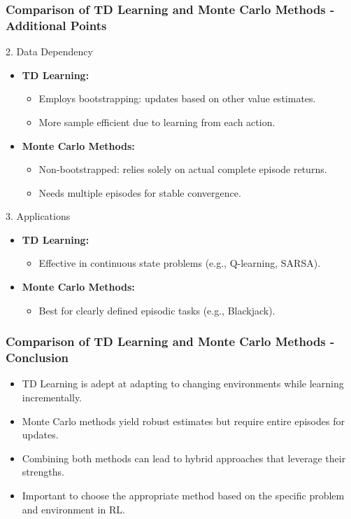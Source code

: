 \documentclass[aspectratio=169]{beamer}
\begin{document}
\begin{frame}[fragile]
    \frametitle{Comparison of TD Learning and Monte Carlo Methods - Additional Points}
    \begin{block}{2. Data Dependency}
        \begin{itemize}
            \item \textbf{TD Learning:}
                \begin{itemize}
                    \item Employs bootstrapping: updates based on other value estimates.
                    \item More sample efficient due to learning from each action.
                \end{itemize}
            \item \textbf{Monte Carlo Methods:}
                \begin{itemize}
                    \item Non-bootstrapped: relies solely on actual complete episode returns.
                    \item Needs multiple episodes for stable convergence.
                \end{itemize}
        \end{itemize}
    \end{block}
    
    \begin{block}{3. Applications}
        \begin{itemize}
            \item \textbf{TD Learning:}
                \begin{itemize}
                    \item Effective in continuous state problems (e.g., Q-learning, SARSA).
                \end{itemize}
            \item \textbf{Monte Carlo Methods:}
                \begin{itemize}
                    \item Best for clearly defined episodic tasks (e.g., Blackjack).
                \end{itemize}
        \end{itemize}
    \end{block}
\end{frame}

\begin{frame}[fragile]
    \frametitle{Comparison of TD Learning and Monte Carlo Methods - Conclusion}
    \begin{itemize}
        \item TD Learning is adept at adapting to changing environments while learning incrementally.
        \item Monte Carlo methods yield robust estimates but require entire episodes for updates.
        \item Combining both methods can lead to hybrid approaches that leverage their strengths.
        \item Important to choose the appropriate method based on the specific problem and environment in RL.
    \end{itemize}
\end{frame}
\end{document}
